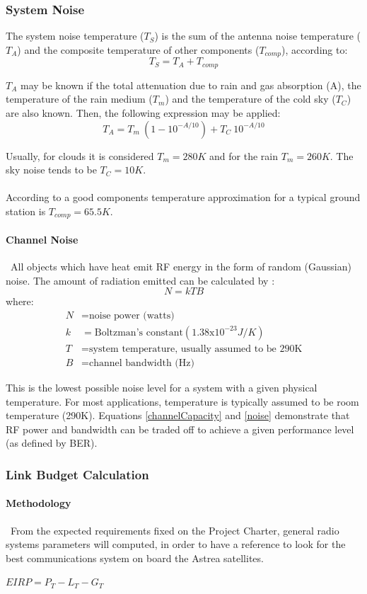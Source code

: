 \subsubsection{System Noise}
The system noise temperature ($T_S$) is the sum of the antenna noise temperature ($T_A$) and
the composite temperature of other components ($T_{comp}$), according to:    \cite{Jorge2012}
\begin{equation}
T_S=T_A+T_{comp}
\end{equation}

$T_A$ may be known if the total attenuation due to rain and gas absorption (A), the
temperature of the rain medium ($T_m$) and the temperature of the cold sky ($T_C$) are also
known. Then, the following expression may be applied:
\begin{equation}
	T_A=T_m\ (1-10^{-A/10})+T_C\ 10^{-A/10}
\end{equation}

Usually, for clouds it is considered $T_m=280K$ and for the rain $T_m=260K$. The sky noise tends to be $T_C=10K$.
\paragraph{} According to \cite{Jorge2012} a good components temperature approximation for a typical ground station is $T_{comp}=65.5K$.

\paragraph{Channel Noise}
\
All objects which have heat emit RF energy in the form of random (Gaussian) noise. The amount of radiation emitted can be calculated by \cite{Note1998}:
\begin{equation}
N=kTB
\label{noise}
\end{equation}
where:
\begin{align*}
	N&= \text{noise power (watts)}\\
	k&= \text{Boltzman's constant}(1.38\mathrm{x}10^{-23}J/K)\\
	T&= \text{system temperature, usually assumed to be 290K}\\
	B&= \text{channel bandwidth (Hz)}
\end{align*}

This is the lowest possible noise level for a system with a given physical temperature. For most applications, temperature is typically assumed to be room temperature (290K). Equations \ref{channelCapacity} and \ref{noise} demonstrate that RF power and bandwidth can be traded off to achieve a given performance level (as defined by BER). \cite{Note1998}

\subsubsection{Link Budget Calculation}
\paragraph{Methodology} \ From the expected requirements fixed on the Project Charter, general radio systems parameters will computed, in order to have a reference to look for the best communications system on board the Astrea satellites.

$EIRP=P_T-L_T-G_T$
